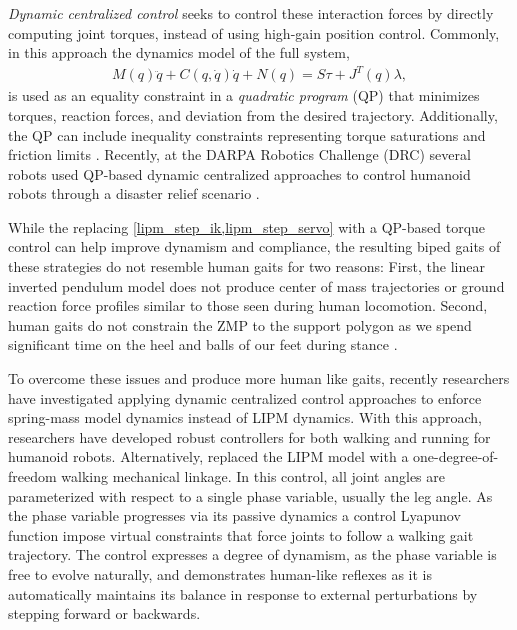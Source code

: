 \emph{Dynamic centralized control} seeks to control these interaction forces by
directly computing joint torques, instead of using high-gain position control.
Commonly, in this approach the dynamics model of the full
system,
\begin{align}
    M(q) \ddot{q} + C(q, \dot{q}) \dot{q} + N(q) = S\tau + J^T(q) \lambda,
    \label{eq:euler_lagrange}
\end{align}
is used as an equality constraint in a \emph{quadratic program} (QP) that
minimizes torques, reaction forces, and deviation from the desired trajectory.
Additionally, the QP can include inequality constraints representing torque
saturations and friction limits \citep{hutter2013hybrid, herzog2014balancing,
saab2013dynamic, wensing2013generation}. Recently, at the DARPA Robotics
Challenge (DRC) several robots used QP-based dynamic centralized approaches to
control humanoid robots through a disaster relief scenario
\citep{feng2015optimization, kuindersma2014efficiently,
englsberger2014trajectory}. 

While the replacing \cref{lipm_step_ik,lipm_step_servo} with a QP-based torque
control can help improve dynamism and compliance, the resulting biped gaits of
these strategies do not resemble human gaits for two reasons: First, the linear
inverted pendulum model does not produce center of mass trajectories or ground
reaction force profiles similar to those seen during human locomotion.  Second,
human gaits do not constrain the ZMP to the support polygon as we spend
significant time on the heel and balls of our feet during stance
\citep{perry2010gait}.

To overcome these issues and produce more human like gaits, recently researchers
have investigated applying dynamic centralized control approaches to enforce
spring-mass model dynamics instead of LIPM dynamics. With this approach,
researchers have developed robust controllers for both walking
\citep{liu2016terrain} and running \citep{martin2015robust} for humanoid robots.
Alternatively, \citet{sreenath2011compliant} replaced the LIPM model with a
one-degree-of-freedom walking mechanical linkage. In this control, all joint
angles are parameterized with respect to a single phase variable, usually the
leg angle. As the phase variable progresses via its passive dynamics a control
Lyapunov function impose virtual constraints that force joints to follow a
walking gait trajectory. The control expresses a degree of dynamism, as the
phase variable is free to evolve naturally, and demonstrates human-like reflexes
as it is automatically maintains its balance in response to external
perturbations by stepping forward or backwards.

